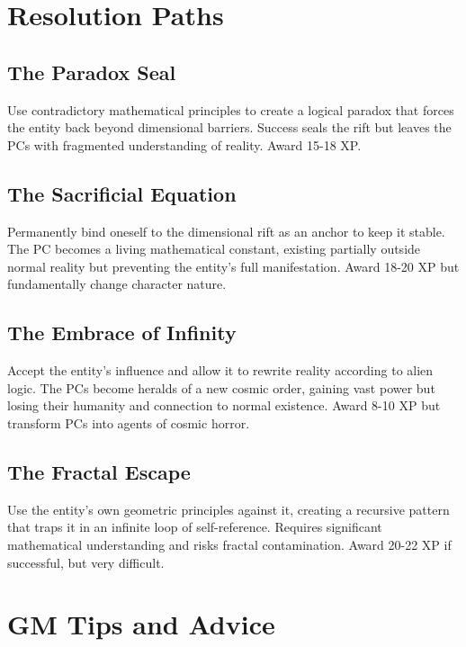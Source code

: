 \documentclass[11pt]{article}
\begin{document}
\section{Resolution Paths}

\subsection{The Paradox Seal}

Use contradictory mathematical principles to create a logical paradox that forces the entity back beyond dimensional barriers. Success seals the rift but leaves the PCs with fragmented understanding of reality. Award 15-18 XP.

\subsection{The Sacrificial Equation}

Permanently bind oneself to the dimensional rift as an anchor to keep it stable. The PC becomes a living mathematical constant, existing partially outside normal reality but preventing the entity's full manifestation. Award 18-20 XP but fundamentally change character nature.

\subsection{The Embrace of Infinity}

Accept the entity's influence and allow it to rewrite reality according to alien logic. The PCs become heralds of a new cosmic order, gaining vast power but losing their humanity and connection to normal existence. Award 8-10 XP but transform PCs into agents of cosmic horror.

\subsection{The Fractal Escape}

Use the entity's own geometric principles against it, creating a recursive pattern that traps it in an infinite loop of self-reference. Requires significant mathematical understanding and risks fractal contamination. Award 20-22 XP if successful, but very difficult.

\section{GM Tips and Advice}
\end{document}
